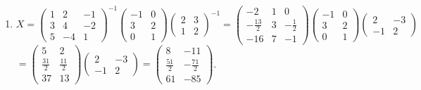 \begin{enumerate}
			 \item %
			       $X = \begin{pmatrix}
					       1 & 2  & -1 \\
					       3 & 4  & -2 \\
					       5 & -4 & 1
				       \end{pmatrix}^{-1}
				       \begin{pmatrix}
					       -1 & 0 \\
					       3  & 2 \\
					       0  & 1
				       \end{pmatrix}
				       \begin{pmatrix}
					       2 & 3 \\
					       1 & 2
				       \end{pmatrix}^{-1} = \begin{pmatrix}
					       -2            & 1 & 0            \\
					       -\frac{13}{2} & 3 & -\frac{1}{2} \\
					       -16           & 7 & -1
				       \end{pmatrix}
				       \begin{pmatrix}
					       -1 & 0 \\
					       3  & 2 \\
					       0  & 1
				       \end{pmatrix}
				       \begin{pmatrix}
					       2  & -3 \\
					       -1 & 2
				       \end{pmatrix}$
			       $= \begin{pmatrix}
					       5            & 2            \\
					       \frac{31}{2} & \frac{11}{2} \\
					       37           & 13
				       \end{pmatrix}
				       \begin{pmatrix}
					       2  & -3 \\
					       -1 & 2
				       \end{pmatrix} = \begin{pmatrix}
					       8            & -11           \\
					       \frac{51}{2} & -\frac{71}{2} \\
					       61           & -85
				       \end{pmatrix}$.
		 \end{enumerate}


